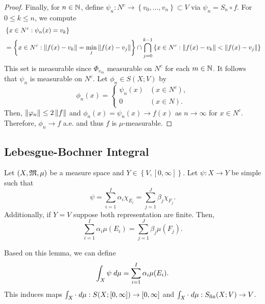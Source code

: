 \documentclass[a4paper]{article}
\begin{document}
\begin{proof}
  Finally, for $n \in \mathbb{N}$, define $\psi_n: N^c
  \to \left\{ v_0, \dots, v_n \right\} \subset V$
  via $\psi_n = S_n \circ f$.
  For $0 \leq k \leq n$, we compute
  \[
  \begin{aligned}
    &
    \left\{ x \in N^c: \psi_n(x) = v_k \right\} \\
    &= \left\{ x \in N^c:
    \left\lVert f(x) - v_k\right\rVert = \min_j \left\lVert f(x) - v_j\right\rVert \right\}
    \cap \bigcap_{j=0}^{k-1}
    \left\{ x \in N^c:
    \left\lVert f(x) - v_k\right\rVert < \left\lVert f(x) - v_j\right\rVert \right\}
  \end{aligned}
  \]
  This set is measurable since $\Phi_{v_m}$ measurable
  on $N^c$ for each $m \in \mathbb{N}$.
  It follows that $\psi_n$ is measurable on $N^c$.
  Let $\phi_n \in S(X; V)$ by
  \[
  \phi_n(x) = \begin{cases}
    \psi_n(x) & (x \in N^c), \\
    0 & (x \in N).
  \end{cases}
  \]
  Then, $\left\lVert \varphi_n\right\rVert \leq 2\left\lVert f\right\rVert$
  and $\phi_n(x) = \psi_n(x) \to f(x)$ as
  $n \to \infty$ for $x \in N^c$.
  Therefore, $\phi_n \to f$ a.e. and thus
  $f$ is $\mu$-measurable.

\end{proof}

\subsection{Lebesgue-Bochner Integral}

\begin{lemma}
  Let $(X, \mathfrak{M}, \mu)$ be a measure space and
  $Y \in \left\{ V, [0, \infty] \right\}$.
  Let $\psi: X \to Y$ be simple such that
  \[
  \psi = \sum_{i=1}^I \alpha_i \chi_{E_i}
  = \sum_{j=1}^J \beta_j \chi_{F_j}.
  \]
  Additionally, if $Y = V$ suppose both representation
  are finite. Then,
  \[
  \sum_{i=1}^I \alpha_i \mu(E_i) = \sum_{j=1}^J
  \beta_j \mu(F_j).
  \]

  Based on this lemma, we can define
  \[
  \int_X \psi \; d\mu = \sum_{i=1}^I \alpha_i \mu(E_i).
  \]
  This induces maps $\int_X \cdot \; d \mu: S(X; [0,
  \infty]) \to [0, \infty]$ and $\int_X \cdot \; d \mu
  : S_{\text{fin}}(X; V) \to V$.
\end{lemma}
\end{document}
